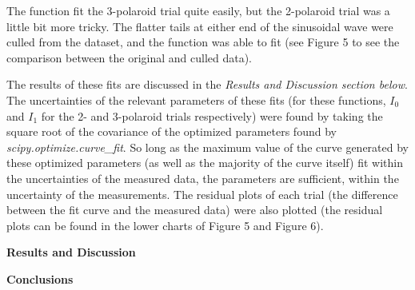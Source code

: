 \documentclass[11pt]{article}
\begin{document}
\begin{multicols}{2}
    The function fit the 3-polaroid trial quite easily, but the 2-polaroid trial was a little bit more tricky. The flatter tails at either end of the sinusoidal wave were culled from the dataset, and the function was able to fit (see Figure 5 to see the comparison between the original and culled data). 

    The results of these fits are discussed in the \textit{Results and Discussion section below}. The uncertainties of the relevant parameters of these fits (for these functions, $I_0$ and $I_1$ for the 2- and 3-polaroid trials respectively) were found by taking the square root of the covariance of the optimized parameters found by \textit{scipy.optimize.curve\_fit}. So long as the maximum value of the curve generated by these optimized parameters (as well as the majority of the curve itself) fit within the uncertainties of the measured data, the parameters are sufficient, within the uncertainty of the measurements. The residual plots of each trial (the difference between the fit curve and the measured data) were also plotted (the residual plots can be found in the lower charts of Figure 5 and Figure 6).
    
    
    \vspace{10pt}

     \selectfont \textbf{Results and Discussion}
    
     \selectfont 



    \vspace{10pt}

     \selectfont \textbf{Conclusions}
    
     \selectfont 




\end{multicols}

    \vspace{10pt}
     
     \selectfont
\end{document}
